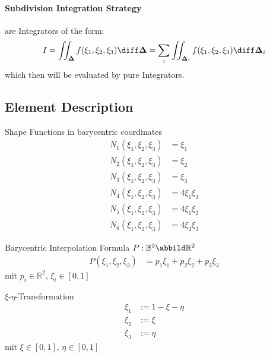 \documentclass{mitschrift}
\newcommand{\simplex}{\boldsymbol{\Delta}}
\begin{document}
\paragraph{Subdivision Integration Strategy} are Integrators of the form: \begin{equation}
    I = \iint_{\simplex} f(\xi_1, \xi_2, \xi_3) \diff \simplex = \sum_{i} \iint_{\simplex_i} f(\xi_1, \xi_2, \xi_3) \diff \simplex_i
\end{equation} which then will be evaluated by pure Integrators.

\subsection{Element Description}

\begin{marginfigure}
    \centering
\end{marginfigure}

Shape Functions in barycentric coordinates \begin{align}
    N_1(\xi_1,\xi_2,\xi_3) &= \xi_1 \\
    N_2(\xi_1,\xi_2,\xi_3) &= \xi_2 \\
    N_3(\xi_1,\xi_2,\xi_3) &= \xi_3 \\
    N_4(\xi_1,\xi_2,\xi_3) &= 4 \xi_1\xi_3 \\
    N_5(\xi_1,\xi_2,\xi_3) &= 4 \xi_1\xi_2 \\
    N_6(\xi_1,\xi_2,\xi_3) &= 4 \xi_2\xi_3
\end{align}

Barycentric Interpolation Formula $P: \mathbb{B}^3 \abbild \mathbb{R}^2$ \begin{align}
    P(\xi_1,\xi_2,\xi_3) &= p_1 \xi_1 + p_2 \xi_2 + p_3 \xi_3
\end{align} mit $p_i \in \mathbb{R}^2$, $\xi_i \in [0,1]$

$\xi$-$\eta$-Transformation \begin{align}
    \xi_1 &:=  1 - \xi - \eta  \\
    \xi_2 &:= \xi\\
    \xi_3 &:=  \eta
\end{align} mit $\xi \in [0,1],\, \eta \in [0,1]$
\end{document}
